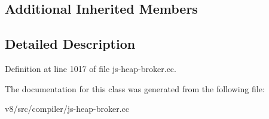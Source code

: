 \subsection*{Additional Inherited Members}


\subsection{Detailed Description}


Definition at line 1017 of file js-\/heap-\/broker.\+cc.



The documentation for this class was generated from the following file\+:\begin{DoxyCompactItemize}
\item 
v8/src/compiler/js-\/heap-\/broker.\+cc\end{DoxyCompactItemize}
